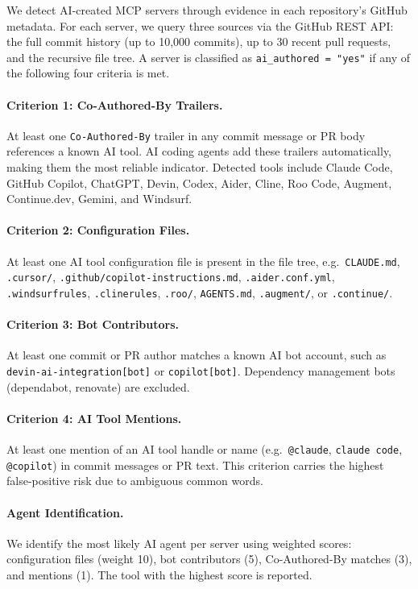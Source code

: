 \documentclass[manuscript,screen,nonacm,oneside]{acmart}
\begin{document}
We detect AI-created MCP servers through evidence in each repository's GitHub metadata. For each server, we query three sources via the GitHub REST API: the full commit history (up to 10,000 commits), up to 30 recent pull requests, and the recursive file tree. A server is classified as \texttt{ai\_authored = "yes"} if any of the following four criteria is met.

\paragraph{Criterion 1: Co-Authored-By Trailers.}
At least one \texttt{Co-Authored-By} trailer in any commit message or PR body references a known AI tool. AI coding agents add these trailers automatically, making them the most reliable indicator. Detected tools include Claude Code, GitHub Copilot, ChatGPT, Devin, Codex, Aider, Cline, Roo Code, Augment, Continue.dev, Gemini, and Windsurf.

\paragraph{Criterion 2: Configuration Files.}
At least one AI tool configuration file is present in the file tree, e.g.\ \texttt{CLAUDE.md}, \texttt{.cursor/}, \texttt{.github/copilot-instructions.md},
\texttt{.aider.conf.yml}, \texttt{.windsurfrules}, \texttt{.clinerules}, \texttt{.roo/}, \texttt{AGENTS.md}, \texttt{.augment/}, or \texttt{.continue/}.

\paragraph{Criterion 3: Bot Contributors.}
At least one commit or PR author matches a known AI bot account, such as \texttt{devin-ai-integration[bot]} or \texttt{copilot[bot]}. Dependency management bots
(dependabot, renovate) are excluded.

\paragraph{Criterion 4: AI Tool Mentions.}
At least one mention of an AI tool handle or name (e.g.\ \texttt{@claude}, \texttt{claude code}, \texttt{@copilot}) in commit messages or PR text. This criterion carries the highest false-positive risk due to ambiguous common words.

\paragraph{Agent Identification.}
We identify the most likely AI agent per server using weighted scores: configuration files (weight 10), bot contributors (5), Co-Authored-By matches (3), and mentions (1). The tool with the highest score is reported.
\end{document}
